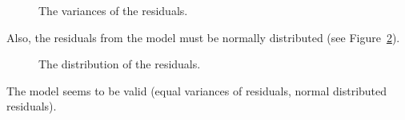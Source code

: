 \documentclass[
  a4paper,
]{scrbook}
\begin{document}
\begin{figure}[H]


\caption{\label{fig-anova-ow-variance}The variances of the residuals.}

\end{figure}%

Also, the residuals from the model must be normally distributed (see
Figure~\ref{fig-anova-ow-qq}).

\begin{figure}[H]


\caption{\label{fig-anova-ow-qq}The distribution of the residuals.}

\end{figure}%

The model seems to be valid (equal variances of residuals, normal
distributed residuals).
\end{document}
